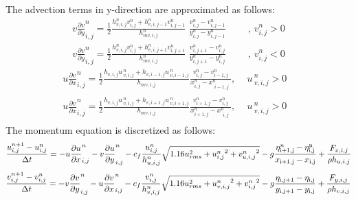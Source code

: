 The advection terms in y-direction are approximated as follows:
\begin{equation} \label{17)} 
\begin{array}{l} {v\frac{\partial v}{\partial y} _{i,j}^{n} =\frac{1}{2} \frac{h_{v,i,j}^{n} v_{i,j}^{n} +h_{v,i,j-1}^{n} v_{i,j-1}^{n} }{h_{mv,i,j}^{n} } \, \, \frac{v_{i,j}^{n} -v_{i,j-1}^{n} }{y_{i,j}^{n} -y_{i,j-1}^{n} } \, \, \, \, \, \, \, \, \, \, \, \, \, \, ,\, v_{i,j}^{n} >0} \\ {v\frac{\partial v}{\partial y} _{i,j}^{n} =\frac{1}{2} \frac{h_{v,i,j}^{n} v_{i,j}^{n} +h_{v,i,j+1}^{n} v_{i,j+1}^{n} }{h_{mv,i,j}^{n} } \, \, \frac{v_{i,j+1}^{n} -v_{i,j}^{n} }{y_{i,j+1}^{n} -y_{i,j}^{n} } \, \, \, \, \, \, \, \, \, \, \, \, \, \, ,\, v_{i,j}^{n} <0} \end{array} 
\end{equation} 
\begin{equation} \label{18)} 
\begin{array}{l} {u\frac{\partial v}{\partial x} _{i,j}^{n} =\frac{1}{2} \frac{h_{v,i,j} u\, _{v,i,j}^{n} +h_{v,i-1,j} u\, _{v,i-1,j}^{n} }{h_{mv,i,j} } \frac{v_{i,j}^{n} -v_{i-1,j}^{n} }{x_{i,j}^{n} -x_{\begin{array}{l} {i-1,j} \\ {} \end{array}}^{n} } ,\, \, \, \, \, \, \, u\, _{v,i,j}^{n} >0\, \, } \\ {u\frac{\partial v}{\partial x} _{i,j}^{n} =\frac{1}{2} \frac{h_{v,i,j} u\, _{v,i,j}^{n} +h_{v,i+1,j} u\, _{v,i+1,j}^{n} }{h_{mv,i,j} } \frac{v_{i+1,j}^{n} -v_{i,j}^{n} }{x_{i+1,j}^{n} -x_{\begin{array}{l} {i,j} \\ {} \end{array}}^{n} } ,\, \, \, \, \, \, \, u\, _{v,i,j}^{n} >0\, \, \, \, \, } \end{array} 
\end{equation} 
The momentum equation is discretized as follows: 
\[\frac{u_{i,j}^{n+1} -u_{i,j}^{n} }{\Delta t} =-u\frac{\partial u}{\partial x} _{i,j}^{n} -v\frac{\partial u}{\partial y} _{i,j}^{n} -c_{f} \frac{u_{i,j}^{n} }{h_{u,i,j}^{n} } \sqrt{1.16u_{rms}^{2} +{u_{i,j}^{n}}^{2} +{v_{u,i,j}^{n}}^{2} } -g\frac{\eta _{{\rm i+1,j}}^{n} -\eta _{{\rm i,j}}^{{\rm n}} }{x_{{\rm i+1,j}} -x_{{\rm i,j}} } +\frac{F_{x,i,j} }{\rho h_{u,i,j} } \] 
\label{19)}
\begin{equation} \label{20)} 
\frac{v_{i,j}^{n+1} -v_{i,j}^{n} }{\Delta t} =-v\frac{\partial v}{\partial y} _{i,j}^{n} -u\frac{\partial v}{\partial x} _{i,j}^{n} -c_{f} \frac{v_{i,j}^{n} }{h_{v,i,j}^{n} } \sqrt{1.16u_{rms}^{2} +{u_{v,i,j}^{n}}^{2} +{v_{i,j}^{n}}^{2} } -g\frac{\eta _{{\rm i,j+1}} -\eta _{{\rm i,j}} }{y_{{\rm i,j+1}} -y_{{\rm i,j}} } +\frac{F_{y,i,j} }{\rho h_{v,i,j} }  
\end{equation} 

